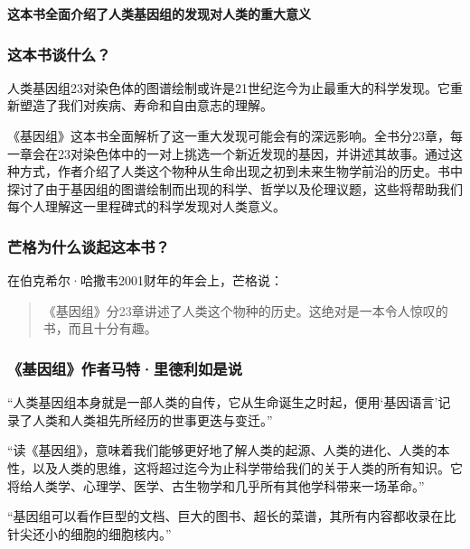 \cleardoublepage



\begin{BookSummaryBox}
\textbf{这本书全面介绍了人类基因组的发现对人类的重大意义}
\par
\end{BookSummaryBox}

\subsubsection*{这本书谈什么？}

人类基因组23对染色体的图谱绘制或许是21世纪迄今为止最重大的科学发现。它重新塑造了我们对疾病、寿命和自由意志的理解。
\par

《基因组》这本书全面解析了这一重大发现可能会有的深远影响。全书分23章，每一章会在23对染色体中的一对上挑选一个新近发现的基因，并讲述其故事。通过这种方式，作者介绍了人类这个物种从生命出现之初到未来生物学前沿的历史。书中探讨了由于基因组的图谱绘制而出现的科学、哲学以及伦理议题，这些将帮助我们每个人理解这一里程碑式的科学发现对人类意义。
\par

\subsubsection*{芒格为什么谈起这本书？}

在伯克希尔·哈撒韦2001财年的年会上，芒格说：
\par

\begin{quotation}
《基因组》分23章讲述了人类这个物种的历史。这绝对是一本令人惊叹的书，而且十分有趣。
\par
\end{quotation}

\subsubsection*{《基因组》作者马特·里德利如是说}

“人类基因组本身就是一部人类的自传，它从生命诞生之时起，便用‘基因语言’记录了人类和人类祖先所经历的世事更迭与变迁。”
\par

“读《基因组》，意味着我们能够更好地了解人类的起源、人类的进化、人类的本性，以及人类的思维，这将超过迄今为止科学带给我们的关于人类的所有知识。它将给人类学、心理学、医学、古生物学和几乎所有其他学科带来一场革命。”
\par

“基因组可以看作巨型的文档、巨大的图书、超长的菜谱，其所有内容都收录在比针尖还小的细胞的细胞核内。”
\par
